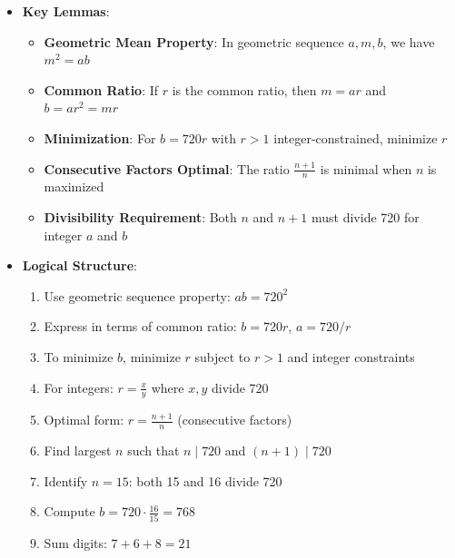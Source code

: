 \documentclass[11pt]{article}
\begin{document}
\begin{strategicbox}
\begin{itemize}[leftmargin=*]
    \item \textbf{Key Lemmas}: 
    \begin{itemize}
        \item \textbf{Geometric Mean Property}: In geometric sequence $a, m, b$, we have $m^2 = ab$
        \item \textbf{Common Ratio}: If $r$ is the common ratio, then $m = ar$ and $b = ar^2 = mr$
        \item \textbf{Minimization}: For $b = 720r$ with $r > 1$ integer-constrained, minimize $r$
        \item \textbf{Consecutive Factors Optimal}: The ratio $\frac{n+1}{n}$ is minimal when $n$ is maximized
        \item \textbf{Divisibility Requirement}: Both $n$ and $n+1$ must divide 720 for integer $a$ and $b$
    \end{itemize}
    
    \item \textbf{Logical Structure}: 
    \begin{enumerate}
        \item Use geometric sequence property: $ab = 720^2$
        \item Express in terms of common ratio: $b = 720r$, $a = 720/r$
        \item To minimize $b$, minimize $r$ subject to $r > 1$ and integer constraints
        \item For integers: $r = \frac{x}{y}$ where $x, y$ divide 720
        \item Optimal form: $r = \frac{n+1}{n}$ (consecutive factors)
        \item Find largest $n$ such that $n \mid 720$ and $(n+1) \mid 720$
        \item Identify $n = 15$: both 15 and 16 divide 720
        \item Compute $b = 720 \cdot \frac{16}{15} = 768$
        \item Sum digits: $7 + 6 + 8 = 21$
    \end{enumerate}
\end{itemize}
\end{strategicbox}
\end{document}
